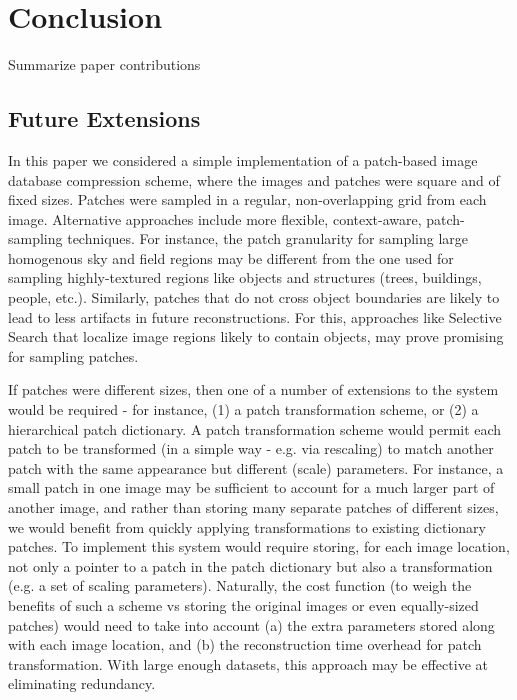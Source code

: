 \section{Conclusion}\label{sec:conclusion}

\begin{edit}
Summarize paper contributions
\end{edit}





\subsection{Future Extensions}
\label{sec:futureext}

In this paper we considered a simple implementation of a patch-based image database compression scheme, where the images and patches were square and of fixed sizes. Patches were sampled in a regular, non-overlapping grid from each image.  Alternative approaches include more flexible, context-aware, patch-sampling techniques. For instance, the patch granularity for sampling large homogenous sky and field regions may be different from the one used for sampling highly-textured regions like objects and structures (trees, buildings, people, etc.). Similarly, patches that do not cross object boundaries are likely to lead to less artifacts in future reconstructions. For this, approaches like Selective Search \cite{UijlingsIJCV2013} that localize image regions likely to contain objects, may prove promising for sampling patches.

If patches were different sizes, then one of a number of extensions to the system would be required - for instance, (1) a patch transformation scheme, or (2) a hierarchical patch dictionary. A patch transformation scheme would permit each patch to be transformed (in a simple way - e.g. via rescaling) to match another patch with the same appearance but different (scale) parameters. For instance, a small patch in one image may be sufficient to account for a much larger part of another image, and rather than storing many separate patches of different sizes, we would benefit from quickly applying transformations to existing dictionary patches. To implement this system would require storing, for each image location, not only a pointer to a patch in the patch dictionary but also a transformation (e.g. a set of scaling parameters). Naturally, the cost function (to weigh the benefits of such a scheme vs storing the original images or even equally-sized patches) would need to take into account (a) the extra parameters stored along with each image location, and (b) the reconstruction time overhead for patch transformation. With large enough datasets, this approach may be effective at eliminating redundancy.

